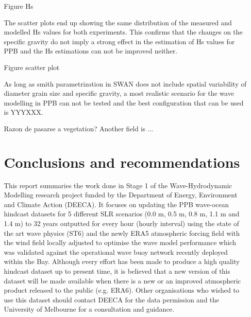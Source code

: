 \documentclass[12pt]{article}
\begin{document}
Figure Hs

The scatter plots end up showing the same distribution of the measured and modelled Hs values for both experiments. This confirms that the changes on the specific gravity do not imply a strong effect in the estimation of Hs values for PPB and the Hs estimations can not be improved neither.

Figure scatter plot

As long as smith parametrization in SWAN does not include spatial variability of diameter grain size and specific gravity, a most realistic scenario for the wave modelling in PPB can not be tested and the best configuration that can be used is YYYXXX. 

Razon de pasarse a vegetation? Another field is ...

\section{Conclusions and recommendations}
This report summaries the work done in Stage 1 of the Wave-Hydrodynamic Modelling research project funded by the Department of Energy, Environment and Climate Action (DEECA). It focuses on updating the PPB wave-ocean hindcast datasets  for 5 different SLR scenarios (0.0 m, 0.5 m, 0.8 m, 1.1 m and 1.4 m) to 32 years outputted for every hour (hourly interval) using the state of the art wave physics (ST6) and the newly ERA5 atmospheric forcing field with the wind field locally adjusted to optimise the wave model performance which was validated against the operational wave buoy network recently deployed within the Bay.  
Although every effort has been made to produce a high quality hindcast dataset up to present time, it is believed that a new version of this dataset will be made available when there is a new or an improved atmospheric product released to the public (e.g. ERA6). Other organisations who wished to use this dataset should contact DEECA for the data permission and the University of Melbourne for a consultation and guidance. 
\end{document}

